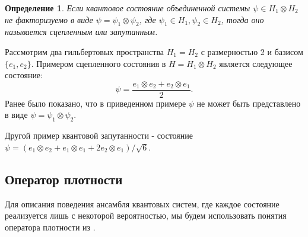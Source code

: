 \documentclass[%
master,         %
subf,           %
href,           %
colorlinks=true %
]{disser}
\numberwithin{equation}{section}
\numberwithin{figure}{section}
\newtheorem{definition}{Определение}[section]
\begin{document}
\begin{definition}
Если квантовое состояние объединенной системы $\psi\in H_1\otimes H_2$ не факторизуемо в виде  $\psi = \psi_1\otimes\psi_2$, где $\psi_1\in H_1, \psi_2\in H_2$, тогда оно называется сцепленным или запутанным. 
\end{definition}  
Рассмотрим два гильбертовых пространства $H_1 = H_2$ с размерностью 2 и базисом $\{e_1, e_2\}$. Примером сцепленного состояния в $H = H_1 \otimes H_2$ является следующее состояние: 
\[
\psi = \frac{e_1\otimes e_2 + e_2\otimes e_1}{2}.
\]
Ранее было показано, что в приведенном примере $\psi$ не может быть представлено в виде $\psi = \psi_1\otimes\psi_2$.

Другой пример квантовой запутанности - состояние $\psi = (e_1\otimes e_2 + e_1 \otimes e_1 + 2e_2 \otimes e_1) / \sqrt{6}$.


\subsection{Оператор плотности}

Для описания поведения ансамбля квантовых систем, где каждое состояние реализуется лишь с некоторой вероятностью, мы будем использовать понятия оператора плотности из \cite{Khrennikov_information}.
\end{document}
